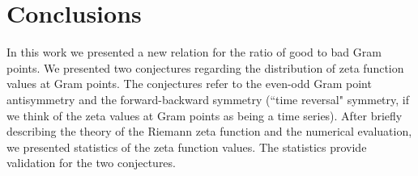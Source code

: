 \documentclass[twoside]{article}
\begin{document}
\section{\label{conclusions}Conclusions}

In this work we presented a new  relation for the ratio of good to bad Gram points. We presented two conjectures regarding the distribution of zeta function values at Gram points. The conjectures refer to the even-odd Gram point antisymmetry and the forward-backward symmetry (``time reversal" symmetry, if we think of the zeta values at Gram points as being a time series). After briefly describing the theory of the Riemann zeta function and the numerical evaluation, we presented statistics of the zeta function values. The statistics provide validation for the two conjectures.
\end{document}
